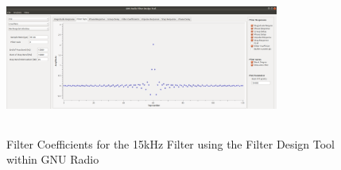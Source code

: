 \begin{figure}[h!]
	\centering
	\includegraphics[height = 5cm, width =9cm]{filter_tool_15kHz_taps.png} %
	\caption{Filter Coefficients for the 15kHz Filter using the Filter Design Tool within GNU Radio}
	\label{fig:taps15}
\end{figure}   
  
 
